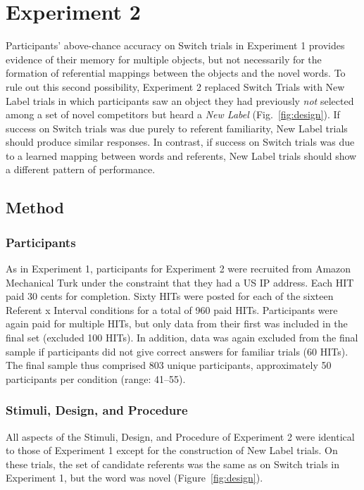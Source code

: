 \documentclass[man,floatsintext]{apa6}
\begin{document}
\section{Experiment 2}

Participants' above-chance accuracy on Switch trials in Experiment 1 provides evidence of their memory for multiple objects, but not necessarily for the formation of referential mappings between the objects and the novel words. To rule out this second possibility, Experiment 2 replaced Switch Trials with New Label trials in which participants saw an object they had previously \emph{not} selected among a set of novel competitors but heard a \emph{New Label} (Fig.~\ref{fig:design}). If success on Switch trials was due purely to referent familiarity, New Label trials should produce similar responses. In contrast, if success on Switch trials was due to a learned mapping between words and referents, New Label trials should show a different pattern of performance.

\subsection{Method}

\subsubsection{Participants}

As in Experiment 1, participants for Experiment 2 were recruited from Amazon Mechanical Turk under the constraint that they had a US IP address. Each HIT paid 30 cents for completion. Sixty HITs were posted for each of the sixteen Referent x Interval conditions for a total of 960 paid HITs. Participants were again paid for multiple HITs, but only data from their first was included in the final set (excluded 100 HITs). In addition, data was again excluded from the final sample if participants did not give correct answers for familiar trials (60 HITs). The final sample thus comprised 803 unique participants, approximately 50 participants per condition (range: 41--55).

\subsubsection{Stimuli, Design, and Procedure}

All aspects of the Stimuli, Design, and Procedure of Experiment 2 were identical to those of Experiment 1 except for the construction of New Label trials. On these trials, the set of candidate referents was the same as on Switch trials in Experiment 1, but the word was novel (Figure~\ref{fig:design}).
\end{document}
